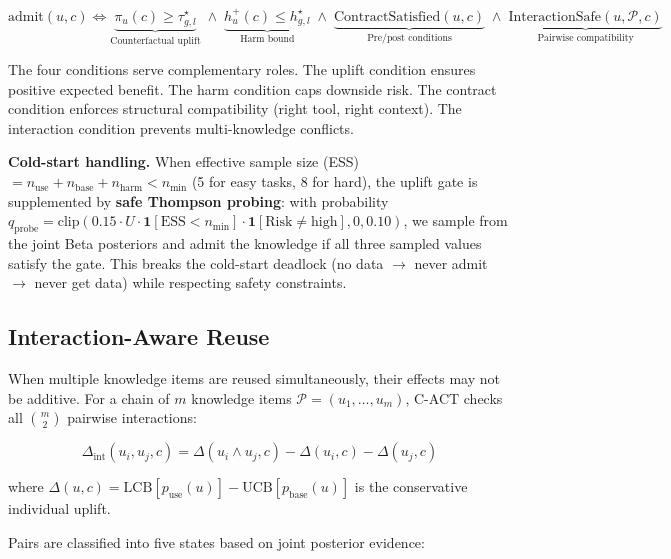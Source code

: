 \documentclass[letterpaper]{article}
\begin{document}
\begin{equation}
\boxed{
\text{admit}(u,c) \Longleftrightarrow
\underbrace{\pi_u(c) \ge \tau_{g,l}^\star}_{\text{Counterfactual uplift}}
\;\land\;
\underbrace{h_u^+(c) \le h_{g,l}^\star}_{\text{Harm bound}}
\;\land\;
\underbrace{\text{ContractSatisfied}(u,c)}_{\text{Pre/post conditions}}
\;\land\;
\underbrace{\text{InteractionSafe}(u, \mathcal{P}, c)}_{\text{Pairwise compatibility}}
}
\end{equation}

The four conditions serve complementary roles. The uplift condition ensures positive expected benefit. The harm condition caps downside risk. The contract condition enforces structural compatibility (right tool, right context). The interaction condition prevents multi-knowledge conflicts.

\textbf{Cold-start handling.} When effective sample size (ESS) $= n_{\text{use}} + n_{\text{base}} + n_{\text{harm}} < n_{\min}$ (5 for easy tasks, 8 for hard), the uplift gate is supplemented by \textbf{safe Thompson probing}: with probability $q_{\text{probe}} = \text{clip}(0.15 \cdot U \cdot \mathbf{1}[\text{ESS} < n_{\min}] \cdot \mathbf{1}[\text{Risk} \neq \text{high}], 0, 0.10)$, we sample from the joint Beta posteriors and admit the knowledge if all three sampled values satisfy the gate. This breaks the cold-start deadlock (no data $\rightarrow$ never admit $\rightarrow$ never get data) while respecting safety constraints.

\subsection{Interaction-Aware Reuse}

When multiple knowledge items are reused simultaneously, their effects may not be additive. For a chain of $m$ knowledge items $\mathcal{P} = (u_1, \ldots, u_m)$, \textsc{C-ACT} checks all $\binom{m}{2}$ pairwise interactions:

\begin{equation}
\Delta_{\text{int}}(u_i, u_j, c) = \Delta(u_i \land u_j, c) - \Delta(u_i, c) - \Delta(u_j, c)
\end{equation}

where $\Delta(u, c) = \text{LCB}[p_{\text{use}}(u)] - \text{UCB}[p_{\text{base}}(u)]$ is the conservative individual uplift.

Pairs are classified into five states based on joint posterior evidence:
\end{document}
